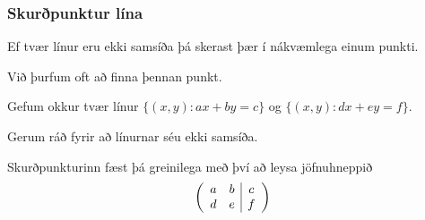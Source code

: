 \iffalse

{
	\frametitle{Skurðpunktur lína}
	{
		\item<1-> Ef tvær línur eru ekki samsíða þá skerast þær í nákvæmlega einum punkti.
		\item<2-> Við þurfum oft að finna þennan punkt.
		\item<3-> Gefum okkur tvær línur $\{(x, y) : ax + by=c\}$ og $\{(x, y) : dx + ey=f\}$.
		\item<4-> Gerum ráð fyrir að línurnar séu ekki samsíða.
		\item<5-> Skurðpunkturinn fæst þá greinilega með því að leysa jöfnuhneppið
			\[
				\left (
				\begin{array}{c c | c}
					a & b & c\\
					d & e & f
				\end{array}
				\right )
			\]
	}
}

